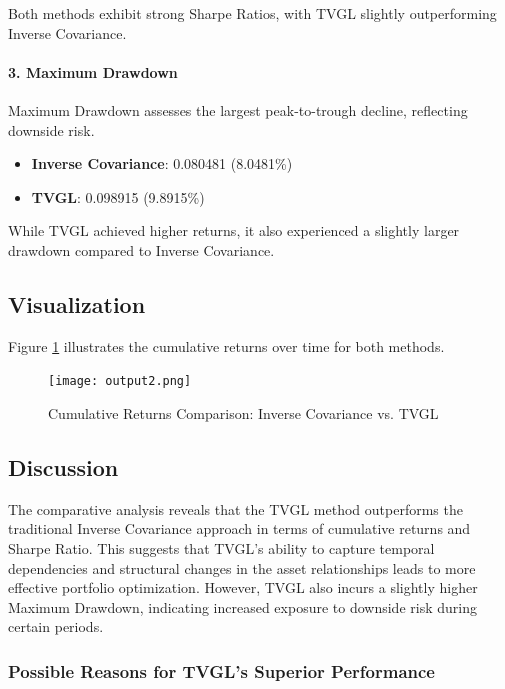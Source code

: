 \documentclass{article}
\begin{document}
Both methods exhibit strong Sharpe Ratios, with TVGL slightly outperforming Inverse Covariance.

\paragraph{3. Maximum Drawdown}

Maximum Drawdown assesses the largest peak-to-trough decline, reflecting downside risk.

\begin{itemize}
    \item \textbf{Inverse Covariance}: 0.080481 (8.0481\%)
    \item \textbf{TVGL}: 0.098915 (9.8915\%)
\end{itemize}

While TVGL achieved higher returns, it also experienced a slightly larger drawdown compared to Inverse Covariance.

\subsection{Visualization}

Figure \ref{fig:cumulative_returns} illustrates the cumulative returns over time for both methods.

\begin{figure}[H]
    \centering
    \texttt{[image: output2.png]}
    \caption{Cumulative Returns Comparison: Inverse Covariance vs. TVGL}
    \label{fig:cumulative_returns}
\end{figure}

\subsection{Discussion}

The comparative analysis reveals that the TVGL method outperforms the traditional Inverse Covariance approach in terms of cumulative returns and Sharpe Ratio. This suggests that TVGL's ability to capture temporal dependencies and structural changes in the asset relationships leads to more effective portfolio optimization. However, TVGL also incurs a slightly higher Maximum Drawdown, indicating increased exposure to downside risk during certain periods.

\subsubsection{Possible Reasons for TVGL's Superior Performance}
\end{document}
